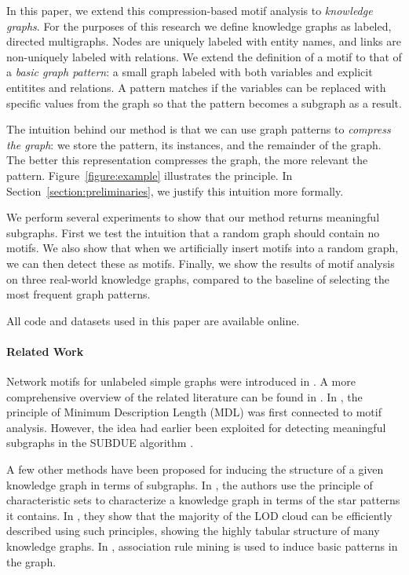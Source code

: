 \documentclass[runningheads]{style/llncs}
\begin{document}
In this paper, we extend this compression-based motif analysis to \emph{knowledge graphs}. For the purposes of this research we define knowledge graphs as labeled, directed multigraphs. Nodes are uniquely labeled with entity names, and links are non-uniquely labeled with relations.  We extend the definition of a motif to that of a \emph{basic graph pattern}: a small graph labeled with both variables and explicit entitites and relations. A pattern matches if the variables can be replaced with specific values from the graph so that the pattern becomes a subgraph as a result. 

The intuition behind our method is that we can use graph patterns to \emph{compress the graph}: we store the pattern, its instances, and the remainder of the graph. The better this representation compresses the graph, the more relevant the pattern. Figure~\ref{figure:example} illustrates the principle. In Section~\ref{section:preliminaries}, we justify this intuition more formally.

We perform several experiments to show that our method returns meaningful subgraphs. First we test the intuition that a random graph should contain no motifs. We also show that when we artificially insert motifs into a random graph, we can then detect these as motifs. Finally, we show the results of motif analysis on three real-world knowledge graphs, compared to the baseline of selecting the most frequent graph patterns.

All code and datasets used in this paper are available online.\footnotemark


\paragraph{Related Work}

Network motifs for unlabeled simple graphs were introduced in \cite{milo2002network}. A more comprehensive overview of the related literature can be found in \cite{bloem2017large}. In \cite{bloem2017large}, the principle of Minimum Description Length (MDL) was first connected to motif analysis. However, the idea had earlier been exploited for detecting meaningful subgraphs in the SUBDUE algorithm \cite{cook1994substructure}.

A few other methods have been proposed for inducing the structure of a given knowledge graph in terms of subgraphs. In \cite{pham2015deriving}, the authors use the principle of characteristic sets to characterize a knowledge graph in terms of the star patterns it contains. In \cite{pham2016exploiting}, they show that the majority of the LOD cloud can be efficiently described using such principles, showing the highly tabular structure of many knowledge graphs. In \cite{volker2011statistical}, association rule mining is used to induce basic patterns in the graph. 
\end{document}
